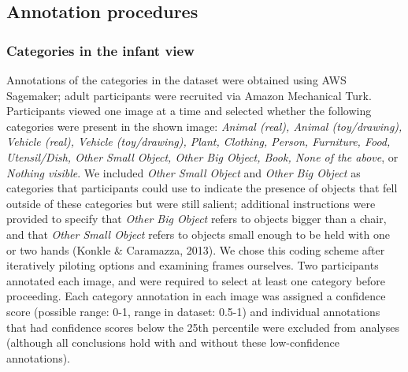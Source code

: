 \documentclass[10pt, letterpaper]{article}
\begin{document}
\hypertarget{annotation-procedures}{%
\subsection{Annotation procedures}\label{annotation-procedures}}

\hypertarget{categories-in-the-infant-view}{%
\subsubsection{Categories in the infant
view}\label{categories-in-the-infant-view}}

Annotations of the categories in the dataset were obtained using AWS
Sagemaker; adult participants were recruited via Amazon Mechanical Turk.
Participants viewed one image at a time and selected whether the
following categories were present in the shown image: \emph{Animal
(real), Animal (toy/drawing), Vehicle (real), Vehicle (toy/drawing),
Plant, Clothing, Person, Furniture, Food, Utensil/Dish, Other Small
Object, Other Big Object, Book, None of the above}, or \emph{Nothing
visible}. We included \emph{Other Small Object} and \emph{Other Big
Object} as categories that participants could use to indicate the
presence of objects that fell outside of these categories but were still
salient; additional instructions were provided to specify that
\emph{Other Big Object} refers to objects bigger than a chair, and that
\emph{Other Small Object} refers to objects small enough to be held with
one or two hands (Konkle \& Caramazza, 2013). We chose this coding
scheme after iteratively piloting options and examining frames
ourselves. Two participants annotated each image, and were required to
select at least one category before proceeding. Each category annotation
in each image was assigned a confidence score (possible range: 0-1,
range in dataset: 0.5-1) and individual annotations that had confidence
scores below the 25th percentile were excluded from analyses (although
all conclusions hold with and without these low-confidence annotations).
\end{document}

